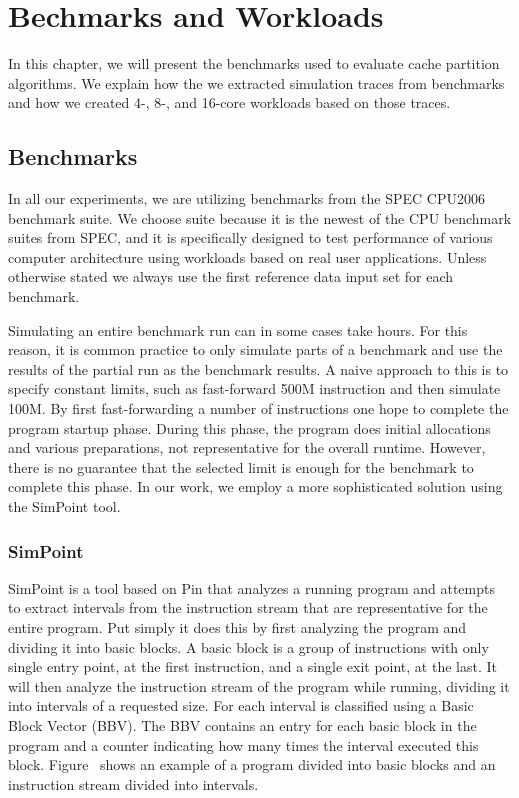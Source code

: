 
\chapter{Bechmarks and Workloads}
\label{cpt:benchmarks_workloads}

In this chapter, we will present the benchmarks used to evaluate cache partition algorithms.
We explain how the we extracted simulation traces from benchmarks and how we created 4-, 8-, and 16-core workloads based on those traces.

\section{Benchmarks}

In all our experiments, we are utilizing benchmarks from the SPEC CPU2006 benchmark suite. 
We choose suite because it is the newest of the CPU benchmark suites from SPEC, and it is specifically designed to test performance of various computer architecture using workloads based on real user applications.
Unless otherwise stated we always use the first reference data input set for each benchmark.

Simulating an entire benchmark run can in some cases take hours.
For this reason, it is common practice to only simulate parts of a benchmark and use the results of the partial run as the benchmark results.
A naive approach to this is to specify constant limits, such as fast-forward 500M instruction and then simulate 100M. 
By first fast-forwarding a number of instructions one hope to complete the program startup phase.
During this phase, the program does initial allocations and various preparations, not representative for the overall runtime.
However, there is no guarantee that the selected limit is enough for the benchmark to complete this phase.
In our work, we employ a more sophisticated solution using the SimPoint tool.

\subsection{SimPoint} 
SimPoint is a tool based on Pin that analyzes a running program and attempts to extract intervals from the instruction stream that are representative for the entire program.
Put simply it does this by first analyzing the program and dividing it into basic blocks.
A basic block is a group of instructions with only single entry point, at the first instruction, and a single exit point, at the last.
It will then analyze the instruction stream of the program while running, dividing it into intervals of a requested size. 
For each interval is classified using a Basic Block Vector (BBV).
The BBV contains an entry for each basic block in the program and a counter indicating how many times the interval executed this block.
Figure~ shows an example of a program divided into basic blocks and an instruction stream divided into intervals.

